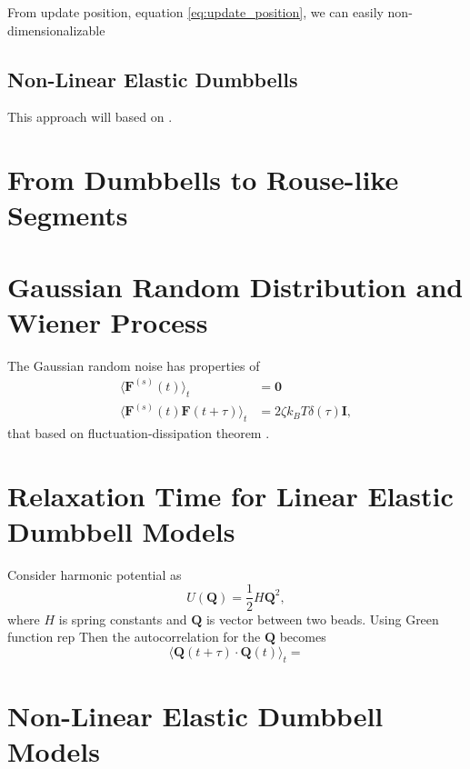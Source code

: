 \documentclass[10pt, a4paper]{article}
\begin{document}
From update position, equation \eqref{eq:update_position}, we can easily non-dimensionalizable



\subsection{Non-Linear Elastic Dumbbells}
This approach will based on \textcite{Herrchen1997}.

\section{From Dumbbells to Rouse-like Segments}



\begin{appendices}
\section{Gaussian Random Distribution and Wiener Process}\label{appen_Wiener_process}
The Gaussian random noise has properties of 
\begin{align}
\langle \mathbf{F}^{(s)}(t)\rangle_t &= \mathbf{0} \\
\langle \mathbf{F}^{(s)}(t)\mathbf{F}(t+\tau)\rangle_t & = 2\zeta k_BT\delta(\tau)\mathbf{I},
\end{align}
that based on fluctuation-dissipation theorem \parencite{Kubo:1966dq}.


\section{Relaxation Time for Linear Elastic Dumbbell Models}\label{appen_relaxation_time_dumbbell}
Consider harmonic potential as
\begin{equation}
U(\mathbf{Q}) = \frac{1}{2}H\mathbf{Q}^2,
\end{equation}
where $H$ is spring constants and $\mathbf{Q}$ is vector between two beads. 
Using Green function rep
Then the autocorrelation for the $\mathbf{Q}$ becomes
\begin{equation}
\langle \mathbf{Q}(t+\tau)\cdot\mathbf{Q}(t)\rangle_t = 
\end{equation}

\section{Non-Linear Elastic Dumbbell Models}
\end{appendices}




\printbibliography
\end{document}
